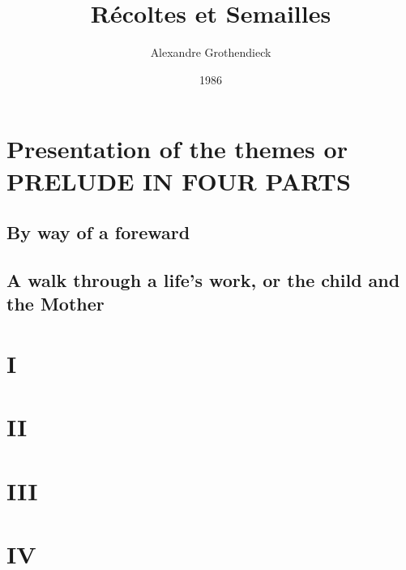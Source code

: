 \documentclass{book}
\begin{document}
\title{R\'ecoltes et Semailles}
\author{Alexandre Grothendieck}
\date{1986}
\maketitle
\tableofcontents

\part*{Presentation of the themes or PRELUDE IN FOUR PARTS}

\chapter{By way of a foreward}


\chapter{A walk through a life's work, or the child and the Mother}


\part{I}

\part{II}
\label{part:II}

\part{III}

\part{IV}

\end{document}
